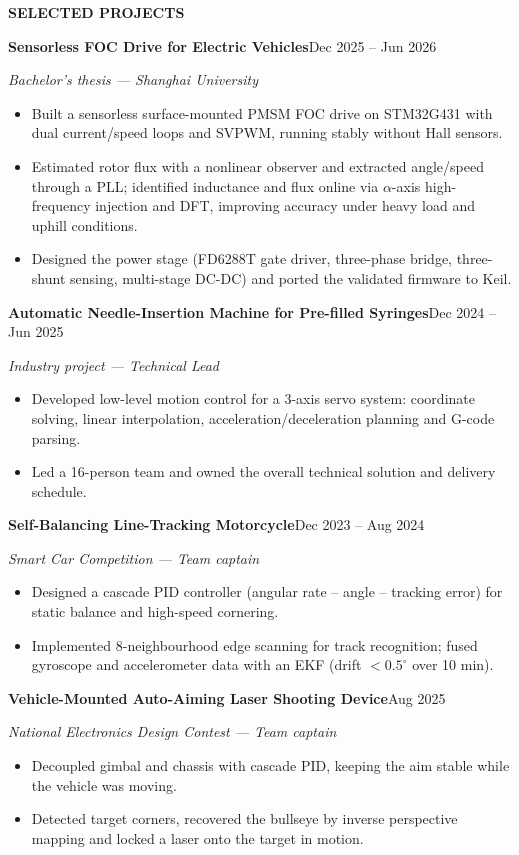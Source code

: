 \documentclass[10pt,a4paper]{article}
\newcommand{\cvsection}[1]{%
  \vspace{0.55em}%
  {\color{accent}\bfseries\large\MakeUppercase{#1}}\par
  \vspace{-0.50em}{\color{hairline}\rule{\linewidth}{0.7pt}}\par
  \vspace{0.20em}%
}
\newcommand{\cventry}[3]{%
  \textbf{#1}\hfill{\small\color{muted}#2}\par
  {\itshape #3}\par
}
\newenvironment{cvitems}{%
  \begin{itemize}[leftmargin=1.05em,labelsep=0.50em,itemsep=0.4pt,
                  topsep=1.0pt,parsep=0pt,partopsep=0pt]\small
}{\end{itemize}}
\begin{document}
\cvsection{Selected Projects}

\cventry{Sensorless FOC Drive for Electric Vehicles}{Dec 2025 -- Jun 2026}%
  {Bachelor's thesis --- Shanghai University}
\begin{cvitems}
  \item Built a sensorless surface-mounted PMSM FOC drive on STM32G431 with dual
        current/speed loops and SVPWM, running stably without Hall sensors.
  \item Estimated rotor flux with a nonlinear observer and extracted angle/speed
        through a PLL; identified inductance and flux online via $\alpha$-axis
        high-frequency injection and DFT, improving accuracy under heavy load and
        uphill conditions.
  \item Designed the power stage (FD6288T gate driver, three-phase bridge,
        three-shunt sensing, multi-stage DC-DC) and ported the validated firmware
        to Keil.
\end{cvitems}

\cventry{Automatic Needle-Insertion Machine for Pre-filled Syringes}{Dec 2024 -- Jun 2025}%
  {Industry project --- Technical Lead}
\begin{cvitems}
  \item Developed low-level motion control for a 3-axis servo system: coordinate
        solving, linear interpolation, acceleration/deceleration planning and
        G-code parsing.
  \item Led a 16-person team and owned the overall technical solution and delivery
        schedule.
\end{cvitems}

\cventry{Self-Balancing Line-Tracking Motorcycle}{Dec 2023 -- Aug 2024}%
  {Smart Car Competition --- Team captain}
\begin{cvitems}
  \item Designed a cascade PID controller (angular rate -- angle -- tracking error)
        for static balance and high-speed cornering.
  \item Implemented 8-neighbourhood edge scanning for track recognition; fused
        gyroscope and accelerometer data with an EKF (drift $<0.5^{\circ}$ over 10 min).
\end{cvitems}

\cventry{Vehicle-Mounted Auto-Aiming Laser Shooting Device}{Aug 2025}%
  {National Electronics Design Contest --- Team captain}
\begin{cvitems}
  \item Decoupled gimbal and chassis with cascade PID, keeping the aim stable while
        the vehicle was moving.
  \item Detected target corners, recovered the bullseye by inverse perspective
        mapping and locked a laser onto the target in motion.
\end{cvitems}
\end{document}
